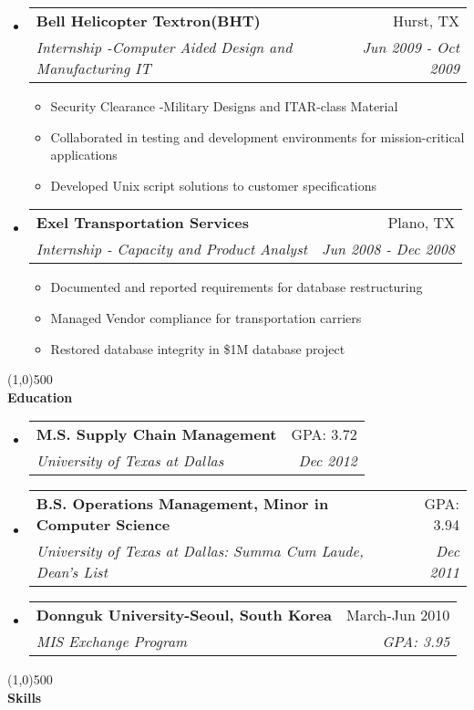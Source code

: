 \documentclass[letterpaper,11pt]{article}
\makeatletter
\newcommand{\resitem}[1]{\item #1 \vspace{-3pt}}
\newcommand{\resheading}[1]{{\large {\textbf{#1 \vphantom{p\^{E}}}}}}
\newcommand{\ressubheading}[4]{
\begin{tabular*}{6.5in}{l@{\extracolsep{\fill}}r}
		\textbf{#1} & #2 \\
		\textit{#3} & \textit{#4} \\
\end{tabular*}\vspace{-6pt}}
\makeatother
\begin{document}
\begin{itemize}
\item
	\ressubheading{Bell Helicopter Textron(BHT)}{Hurst, TX}{Internship -Computer Aided Design and Manufacturing IT}{Jun 2009 - Oct 2009}
	\begin{itemize}
		\resitem{Security Clearance -Military Designs and ITAR-class Material}
		\resitem{Collaborated in testing and development environments for mission-critical applications}
		\resitem{Developed Unix script solutions to customer specifications}
	\end{itemize}

\item
	\ressubheading{Exel Transportation Services}{Plano, TX}{Internship - Capacity and Product Analyst}{Jun 2008 - Dec 2008}
	\begin{itemize}
		\resitem{Documented and reported requirements for database restructuring}
		\resitem{Managed Vendor compliance for transportation carriers}
		\resitem{Restored database integrity in \$1M database project}
	\end{itemize}

\end{itemize}
\line(1,0){500}
\\
\resheading{Education}
\begin{itemize}
\item
	\ressubheading{M.S. Supply Chain Management}{GPA: 3.72}
{University of Texas at Dallas}{Dec 2012}	

\item
	\ressubheading{B.S. Operations Management, Minor in Computer Science}{GPA: 3.94}
{University of Texas at Dallas: Summa Cum Laude, Dean's List}{Dec 2011}	

\item
	\ressubheading{Donnguk University-Seoul, South Korea}{March-Jun 2010}{MIS Exchange Program}{GPA: 3.95}
\end{itemize}

\line(1,0){500}
\\
\resheading{Skills}
\end{document}
